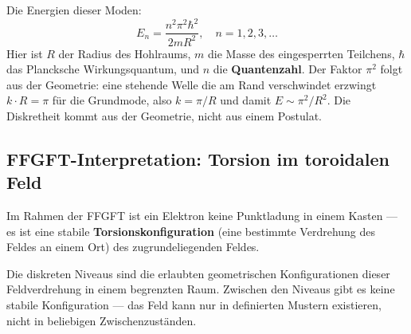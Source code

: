 Die Energien dieser Moden:
\begin{equation}
  E_n = \frac{n^2 \pi^2 \hbar^2}{2m R^2},
  \quad n = 1, 2, 3, \ldots
\end{equation}
Hier ist $R$ der Radius des Hohlraums, $m$ die Masse des
eingesperrten Teilchens, $\hbar$ das Plancksche Wirkungsquantum,
und $n$ die \textbf{Quantenzahl}.
Der Faktor $\pi^2$ folgt aus der Geometrie: eine stehende Welle
die am Rand verschwindet erzwingt $k \cdot R = \pi$ für die Grundmode,
also $k = \pi/R$ und damit $E \sim \pi^2/R^2$.
Die Diskretheit kommt aus der Geometrie, nicht aus einem Postulat.

\subsection{FFGFT-Interpretation: Torsion im toroidalen Feld}

Im Rahmen der FFGFT ist ein Elektron keine Punktladung
in einem Kasten --- es ist eine stabile
\textbf{Torsionskonfiguration} (eine bestimmte Verdrehung
des Feldes an einem Ort) des zugrundeliegenden Feldes.

Die diskreten Niveaus sind die erlaubten geometrischen
Konfigurationen dieser Feldverdrehung in einem begrenzten Raum.
Zwischen den Niveaus gibt es keine stabile Konfiguration ---
das Feld kann nur in definierten Mustern existieren,
nicht in beliebigen Zwischenzuständen.

